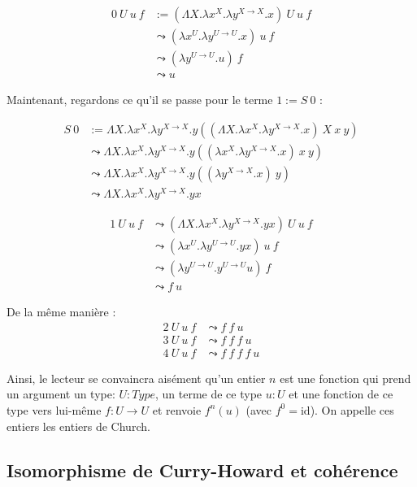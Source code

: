 \documentclass[a4paper,12pt]{article}
\theoremstyle{plain}
\begin{document}
\begin{align*}
0 \ U \ u \ f &:= (\Lambda X. \lambda x^X. \lambda y^{X \to X}. x) \ U \ u \ f\\
& \leadsto (\lambda x^U. \lambda y^{U \to U}. x)  \ u \ f \\
& \leadsto ( \lambda y^{U \to U}. u) \ f \\
& \leadsto u
\end{align*}

Maintenant, regardons ce qu'il se passe pour le terme $1 := S \ 0$ :

\begin{align*}
S \ 0 &:= \Lambda X. \lambda x^X. \lambda y^{X \to X}. y  ( (\Lambda X. \lambda x^X. \lambda y^{X \to X}. x)\  X \ x \ y)\\
& \leadsto \Lambda X. \lambda x^X. \lambda y^{X \to X}. y  ( (\lambda x^X. \lambda y^{X \to X}. x) \ x \ y)\\
& \leadsto \Lambda X. \lambda x^X. \lambda y^{X \to X}. y ( (\lambda y^{X \to X}. x )\ y)\\
& \leadsto \Lambda X. \lambda x^X. \lambda y^{X \to X}. y x 
\end{align*}

\begin{align*}
1 \ U \ u \ f & \leadsto (\Lambda X. \lambda x^X. \lambda y^{X \to X}. y x) \ U \ u \ f\\
& \leadsto  (\lambda x^U. \lambda y^{U \to U}. y x) \ u \ f \\
& \leadsto (\lambda y^{U \to U}. y^{U \to U} u) \ f \\
& \leadsto f \ u
\end{align*}

De la même manière : 
\begin{align*}
2 \ U \ u \ f  &\leadsto f \ f \ u \\
3 \ U \ u \ f &\leadsto f \ f \ f \ u \\
4 \ U \ u \ f &\leadsto f \ f \ f \ f \ u 
\end{align*}

Ainsi, le lecteur se convaincra aisément qu'un entier $n$ est une fonction qui prend un argument un type: $U : \mathit{Type}$, un terme de ce type $u : U$ et une fonction de ce type vers lui-même $f: U \to U$ et renvoie $f^n (u)$ (avec $f^0 = \mathrm{id}$). On appelle ces entiers les entiers de Church.

\subsection{Isomorphisme de Curry-Howard et cohérence}
\end{document}
